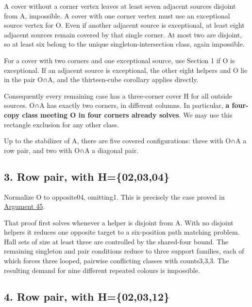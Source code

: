 \documentclass[
  10pt,
]{article}
\begin{document}
A cover without a corner vertex leaves at least seven adjacent sources
disjoint from A, impossible. A cover with one corner vertex must use an
exceptional source vertex for O. Even if another adjacent source is
exceptional, at least eight adjacent sources remain covered by that
single corner. At most two are disjoint, so at least six belong to the
unique singleton-intersection class, again impossible.

For a cover with two corners and one exceptional source, use Section 1
if O is exceptional. If an adjacent source is exceptional, the other
eight helpers and O lie in the pair O∩A, and the thirteen-cube corollary
applies directly.

Consequently every remaining case has a three-corner cover H for all
outside sources. O∩A has exactly two corners, in different columns. In
particular, \textbf{a four-copy class meeting O in four corners already
solves}. We may use this rectangle exclusion for any other class.

Up to the stabilizer of A, there are five covered configurations: three
with O∩A a row pair, and two with O∩A a diagonal pair.

\hypertarget{row-pair-with-h020304}{%
\subsection*{3. Row pair, with
H=\{02,03,04\}}\label{row-pair-with-h020304}}

Normalize O to opposite04, omitting1. This is precisely the
case proved in \protect\hyperlink{arg-45}{Argument 45}.

That proof first solves whenever a helper is disjoint from A. With no
disjoint helpers it reduces one opposite target to a six-position path
matching problem. Hall sets of size at least three are controlled by the
shared-four bound. The remaining singleton and pair conditions reduce to
three support families, each of which forces three looped, pairwise
conflicting classes with counts3,3,3. The resulting demand for nine
different repeated colours is impossible.

\hypertarget{row-pair-with-h020312-1}{%
\subsection*{4. Row pair, with
H=\{02,03,12\}}\label{row-pair-with-h020312-1}}
\end{document}
